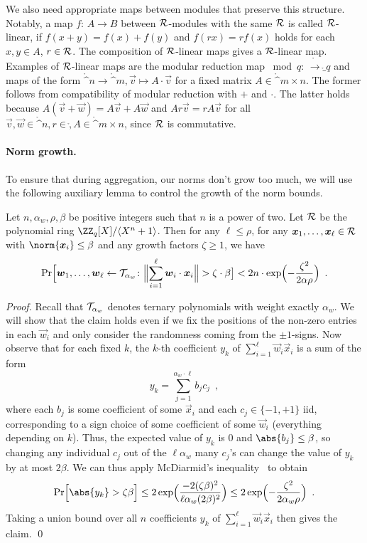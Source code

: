 We also need appropriate maps between modules that preserve this structure. Notably, a map $f\colon\,A\to B$ between $\mathcal{R}$-modules with the same $\mathcal{R}$ is called $\mathcal{R}$-linear, if $f(x+y) = f(x) + f(y)$ and $f(rx) = rf(x)$ holds for each $x,y\in A$, $r\in\mathcal{R}$. The composition of $\mathcal{R}$-linear maps gives a $\mathcal{R}$-linear map.
Examples of $\mathcal{R}$-linear maps are the modular reduction map ${}\bmod q\colon\,\ring\to\ring_q$ and maps of the form $\ring^n \to \ring^m, \vec{v}\mapsto A\cdot \vec{v}$ for a fixed matrix $A\in\ring^{m\times n}$. The former follows from compatibility of modular reduction with $+$ and $\cdot$. The latter holds because $A(\vec{v}+\vec{w}) = A\vec{v} + A\vec{w}$ and $Ar\vec{v} = rA\vec{v}$ for all $\vec{v},\vec{w}\in\ring^n, r\in \ring, A\in\ring^{m\times n}$, since $\mathcal{R}$ is commutative.

\paragraph{Norm growth.}
To ensure that during aggregation, our norms don't grow too much, we will use the following auxiliary lemma to control the growth of the norm bounds.
\begin{lemma}\label{lem:normgrowth}
Let $n, \alpha_w, \rho, \beta$ be positive integers such that $n$ is a power of two.
Let $\mathcal{R}$ be the polynomial ring $\defringq$.
Then for any $\ell\leq \rho$, for any $\boldsymbol{x}_1,\ldots,\boldsymbol{x}_\ell\in \mathcal{R}$ with $\norm{\vec{x}_i}\leq \beta$ and any growth factors $\zeta \geq 1$, we have
\[
 \Pr\Bigl[\vec{w}_1,\ldots,\vec{w}_\ell \gets \tern_{\alpha_w}\colon \Bigl\|\smashoperator{\sum_{i=1}^{\ell}} \vec{w}_i\cdot \vec{x}_i\Bigr\| > \zeta\cdot \beta \bigr] < 2n\cdot \exp\Bigl(-\frac{\zeta^2}{2\alpha\rho}\Bigr)\enspace.
\]
\end{lemma}
\begin{proof}
Recall that $\mathcal{T}_{\alpha_w}$ denotes ternary polynomials with weight exactly $\alpha_w$. We will show that the claim holds even if we fix the positions of the non-zero entries in each $\vec{w}_i$ and only consider the randomness coming from the $\pm 1$-signs.
Now observe that for each fixed $k$, the $k$-th coefficient $y_k$ of $\sum_{i=1}^{\ell} \vec{w}_i \vec{x}_i$ is a sum of the form
\[
 y_k = \sum_{j=1}^{\alpha_w\cdot \ell} b_j c_j\enspace,
\]
where each $b_j$ is some coefficient of some $\vec{x}_i$ and each $c_j\in\{-1,+1\}$ iid, corresponding to a sign choice of some coefficient of some $\vec{w}_i$ (everything depending on $k$).
Thus, the expected value of $y_k$ is 0 and $\abs{b_j}\leq \beta$, so changing any individual $c_j$ out of the $\ell\alpha_w$ many $c_j$'s can change the value of $y_k$ by at most $2\beta$.
We can thus apply McDiarmid's inequality~\cite{McDiarmid89} to obtain
\[
 \Pr\Bigl[\abs{y_k} > \zeta\beta\Bigr] \leq 2\exp\Bigl(\frac{-2(\zeta\beta)^2}{\ell\alpha_w(2\beta)^2}\Bigr) \leq 2\exp\Bigl(- \frac{\zeta^2}{2\alpha_w\rho} \Bigr)\enspace.
\]
Taking a union bound over all $n$ coefficients $y_k$ of $\sum_{i=1}^{\ell} \vec{w}_i \vec{x}_i$ then gives the claim.
\qed
\end{proof}

